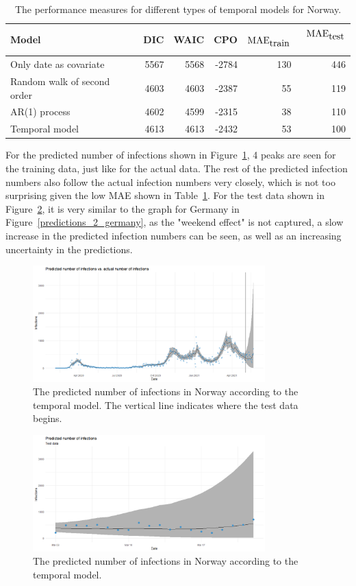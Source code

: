 \begin{table}[H] 
\caption{The performance measures for different types of temporal models for Norway. \label{norway_temporal}}
\begin{tabular}{l r r r r r}
\toprule
\textbf{Model}	& \textbf{DIC}	& \textbf{WAIC} & \textbf{CPO} & \textbf{$\hbox{MAE}_{\hbox{train}}$} & \textbf{$\hbox{MAE}_{\hbox{test}}$}\ \\
\midrule
Only date as covariate & 5567 & 5568 & -2784 & 130 & 446 \\
Random walk of second order & 4603 & 4603 & -2387 & 55 & 119 \\
AR(1) process & 4602 & 4599 & -2315 & 38 & 110 \\
Temporal model &  4613 & 4613 & -2432 & 53 & 100 \\
\bottomrule
\end{tabular}
\end{table}
For the predicted number of infections shown in Figure~\ref{predictions_1_norway}, 4 peaks are seen for the training data, just like for the actual data. The rest of the predicted infection numbers also follow the actual infection numbers very closely, which is not too surprising given the low MAE shown in Table~\ref{norway_temporal}. For the test data shown in Figure~\ref{predictions_2_norway}, it is very similar to the graph for Germany in Figure~\ref{predictions_2_germany}, as the "weekend effect" is not captured, a slow increase in the predicted infection numbers can be seen, as well as an increasing uncertainty in the predictions.
\begin{figure}[H]
  \centering
  \includegraphics[width = 0.8\textwidth]{predictions_1_norway.png}
  \caption{The predicted number of infections in Norway according to the temporal model. The vertical line indicates where the test data begins.}
  \label{predictions_1_norway}
\end{figure}
\begin{figure}[H]
  \centering
  \includegraphics[width = 0.8\textwidth]{predictions_2_norway.png}
  \caption{The predicted number of infections in Norway according to the temporal model.}
  \label{predictions_2_norway}
\end{figure}

